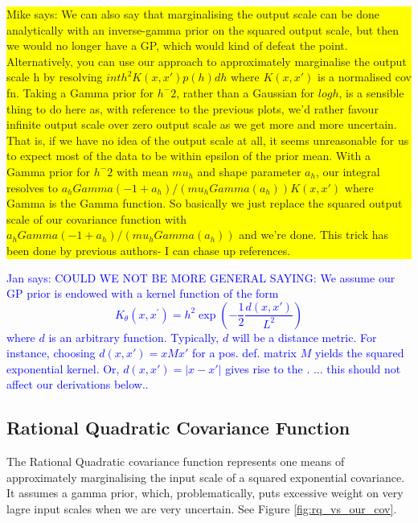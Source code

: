 \documentclass{article}
\newcommand\jansays[1]{\textcolor{blue}{Jan says: #1}}
\newcommand\mikesays[1]{\colorbox{yellow}{\parbox{\columnwidth}{Mike says: #1}}}
\begin{document}
\mikesays{We can also say that marginalising the output scale can be done
analytically with an inverse-gamma prior on the squared output scale,
but then we would no longer have a GP, which would kind of defeat the
point. Alternatively, you can use our approach to approximately
marginalise the output scale h by resolving
$int h^2 K(x, x') p(h) dh$
where $K(x, x')$ is a normalised cov fn. Taking a Gamma prior for $h^-2$,
rather than a Gaussian for  $log h$, is a sensible thing to do here as,
with reference to the previous plots, we'd rather favour infinite
output scale over zero output scale as we get more and more uncertain.
That is, if we have no idea of the output scale at all, it seems
unreasonable for us to expect most of the data to be within epsilon of
the prior mean. With a Gamma prior for $h^-2$ with mean $mu_h$ and shape
parameter $a_h$, our integral resolves to
$a_h Gamma(-1 + a_h) / (mu_h Gamma(a_h) ) K(x, x')$
where Gamma is the Gamma function. So basically we just replace the
squared output scale of our covariance function with $a_h Gamma(-1 +
a_h) / (mu_h Gamma(a_h) )$ and we're done. This trick has been done by previous authors- I can chase up references.}

\jansays{ COULD WE NOT BE MORE GENERAL SAYING:  
We assume our GP prior is endowed with a kernel function of the form 
\begin{equation}
K_\theta(x,x^\prime) = h^2 \exp \left( -\frac{1}{2} \frac{d(x,x')}{L^2} \right)
\end{equation}
where $d$ is an arbitrary function. Typically, $d$ will be a distance metric. For instance, choosing $d(x,x') = x M x'$ for a pos. def. matrix $M$ yields the squared exponential kernel. Or, $d(x,x') = |x-x'|$ gives rise to the .
... this should not affect our derivations below..}

\subsection{Rational Quadratic Covariance Function} 

The Rational Quadratic covariance function represents one means of approximately marginalising the input scale of a squared exponential covariance. It assumes a gamma prior, which, problematically, puts excessive weight on very lagre input scales when we are very uncertain. See Figure \ref{fig:rq_vs_our_cov}.
\end{document}
